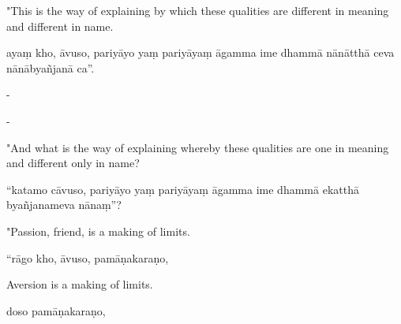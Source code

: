 \begin{samepage}
\begin{leftcolumn*}
"This is the way of explaining by which these qualities are different in meaning and different in name.
\end{leftcolumn*}

\begin{rightcolumn}
ayaṃ kho, āvuso, pariyāyo yaṃ pariyāyaṃ āgamma ime dhammā nānātthā ceva nānābyañjanā ca”.
\end{rightcolumn}
\end{samepage}

\begin{samepage}
\begin{leftcolumn*}
-
\end{leftcolumn*}

\begin{rightcolumn}
-
\end{rightcolumn}
\end{samepage}

\begin{samepage}
\begin{leftcolumn*}
"And what is the way of explaining whereby these qualities are one in meaning and different only in name?
\end{leftcolumn*}

\begin{rightcolumn}
“katamo cāvuso, pariyāyo yaṃ pariyāyaṃ āgamma ime dhammā ekatthā byañjanameva nānaṃ”?
\end{rightcolumn}
\end{samepage}

\begin{samepage}
\begin{leftcolumn*}
"Passion, friend, is a making of limits.
\end{leftcolumn*}

\begin{rightcolumn}
“rāgo kho, āvuso, pamāṇakaraṇo,
\end{rightcolumn}
\end{samepage}

\begin{samepage}
\begin{leftcolumn*}
Aversion is a making of limits.
\end{leftcolumn*}

\begin{rightcolumn}
doso pamāṇakaraṇo,
\end{rightcolumn}
\end{samepage}

